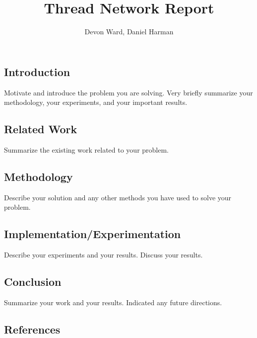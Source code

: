\documentclass[letterpaper,twocolumn,10pt]{article}
\title{Thread Network Report}
\author{Devon Ward, Daniel Harman}
\begin{document}
\maketitle

\subsection*{Introduction}

Motivate and introduce the problem you are solving. Very briefly summarize your methodology, your experiments, and your important results.

\subsection*{Related Work}

Summarize the existing work related to your problem.

\subsection*{Methodology}

Describe your solution and any other methods you have used to solve your problem.

\subsection*{Implementation/Experimentation}

Describe your experiments and your results. Discuss your results.

\subsection*{Conclusion}

Summarize your work and your results. Indicated any future directions.

\subsection*{References}

\printbibliography
\end{document}
